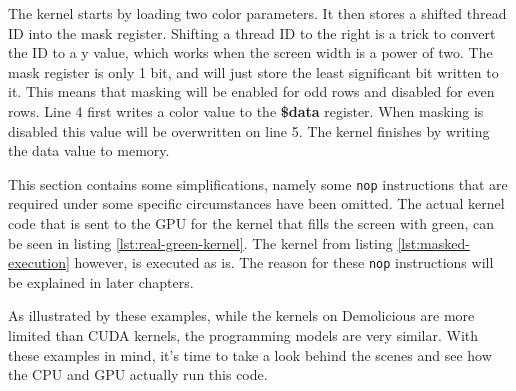 \documentclass[../main/report.tex]{subfiles}
\begin{document}
The kernel starts by loading two color parameters.
It then stores a shifted thread ID into the mask register.
Shifting a thread ID to the right is a trick to convert the ID to a y value,
which works when the screen width is a power of two.
The mask register is only 1 bit, and will just store the least significant bit written to it.
This means that masking will be enabled for odd rows and disabled for even rows.
Line 4 first writes a color value to the \textbf{\$data} register.
When masking is disabled this value will be overwritten on line 5.
The kernel finishes by writing the data value to memory.

This section contains some simplifications, namely some \verb/nop/ instructions that are required under some specific circumstances have been omitted.
The actual kernel code that is sent to the GPU for the kernel that fills the screen with green,
can be seen in listing \ref{lst:real-green-kernel}.
The kernel from listing \ref{lst:masked-execution} however, is executed as is. The reason for these \verb/nop/ instructions will be explained in later chapters.


As illustrated by these examples, while the kernels on Demolicious are more limited than CUDA kernels, the programming models are very similar.
With these examples in mind, it's time to take a look behind the scenes and see how the CPU and GPU actually run this code.
\end{document}
